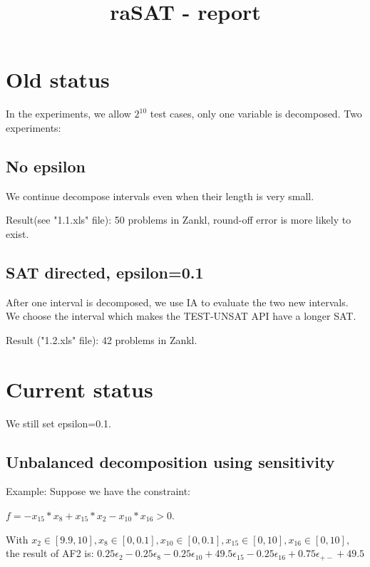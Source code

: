\documentclass[12pt]{article}
\title{raSAT - report}
\begin{document}
\maketitle
\section{Old status}

In the experiments, we allow $2^{10}$ test cases, only one variable is decomposed. Two experiments:

\subsection{No epsilon}
We continue decompose intervals even when their length is very small.

Result(see "1.1.xls" file): 50 problems in Zankl, round-off error is more likely to exist.

\subsection{SAT directed, epsilon=0.1}
After one interval is decomposed, we use IA to evaluate the two new intervals. We choose the interval which makes the TEST-UNSAT API have a longer SAT.

Result ("1.2.xls" file): 42 problems in Zankl.

\section{Current status}
We still set epsilon=0.1.

\subsection{Unbalanced decomposition using sensitivity}
Example: Suppose we have the constraint: 

$f = -x_{15}*x_8+x_{15}*x_2-x_{10}*x_{16}>0$. 

With $x_2 \in [9.9, 10], x_8 \in [0, 0.1], x_{10} \in [0, 0.1], x_{15} \in [0, 10], x_{16} \in [0, 10]$, the result of AF2 is: $0.25 \epsilon_2 - 0.25 \epsilon_8 - 0.25 \epsilon_{10} + 49.5\epsilon_{15} - 0.25\epsilon_{16} + 0.75\epsilon_{+-} + 49.5$
\end{document}
